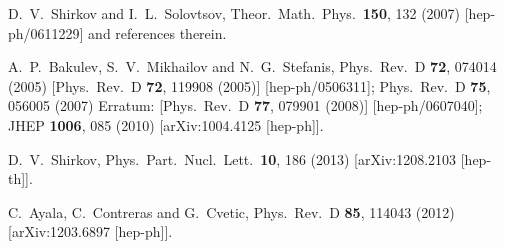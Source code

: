 \documentclass[3p,times,twocolumn]{elsarticle}
\begin{document}
\begin{thebibliography}{999}
  D.~V.~Shirkov and I.~L.~Solovtsov,
  Theor.\ Math.\ Phys.\  {\bf 150}, 132 (2007)
  [hep-ph/0611229] and references therein. 

  A.~P.~Bakulev, S.~V.~Mikhailov and N.~G.~Stefanis,
  Phys.\ Rev.\ D {\bf 72}, 074014 (2005)
  [Phys.\ Rev.\ D {\bf 72}, 119908 (2005)]
  [hep-ph/0506311];
  Phys.\ Rev.\ D {\bf 75}, 056005 (2007)
  Erratum: [Phys.\ Rev.\ D {\bf 77}, 079901 (2008)]
  [hep-ph/0607040];
  JHEP {\bf 1006}, 085 (2010)
  [arXiv:1004.4125 [hep-ph]].
 
  D.~V.~Shirkov,
  Phys.\ Part.\ Nucl.\ Lett.\  {\bf 10}, 186 (2013)
  [arXiv:1208.2103 [hep-th]].

  C.~Ayala, C.~Contreras and G.~Cvetic,
  Phys.\ Rev.\ D {\bf 85}, 114043 (2012)
  [arXiv:1203.6897 [hep-ph]].


\end{thebibliography}
\end{document}
